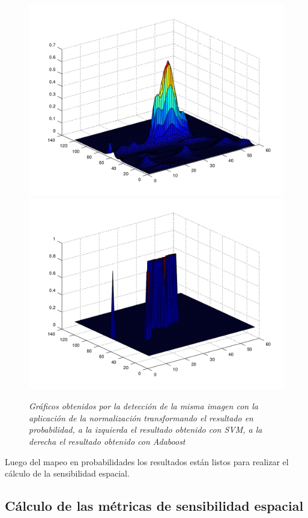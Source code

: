 \begin{figure}[H]
  \centering
  \includegraphics[scale=.3]{images/svmoutput}
  \includegraphics[scale=.3]{images/boostoutput}
  \caption{\em Gráficos obtenidos por la detección de la misma imagen con la aplicación de la normalización transformando el resultado en  probabilidad, a la izquierda el resultado obtenido con SVM, a la derecha el resultado obtenido con Adaboost}  
  \label{fig:output}
\end{figure}

Luego del mapeo en probabilidades los resultados están listos para realizar el cálculo de la sensibilidad espacial.

\subsection{Cálculo de las métricas de sensibilidad espacial}


